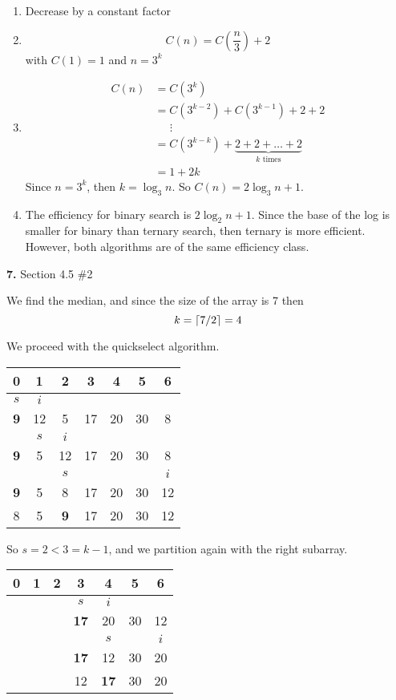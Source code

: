 \documentclass[letterpaper, 11pt]{article}
\newcommand{\hwnumbersec}[3]{\medskip \noindent\textbf{#1.} Section #2 \##3 \smallskip}
\DeclarePairedDelimiter{\ceil}{\lceil}{\rceil}
\begin{document}
\begin{enumerate}[label = (\alph*)]
  \item Decrease by a constant factor
  \item \[C(n) = C\left(\frac{n}{3}\right) + 2\]
    with \(C(1) = 1\) and \(n = 3^k\)
  \item 
    \begin{align*}
      C(n) &= C(3^k) \\
           &= C(3^{k-2}) + C(3^{k-1}) + 2 + 2\\
           &\;\;\;\;\;\vdots \\
           &= C(3^{k-k}) + \underbrace{2 + 2 + \dots + 2}_{k \text{ times}}\\
           &= 1 + 2k
    \end{align*}
    Since \(n = 3^k\), then \(k = \log_3 n\). So \(C(n) = 2\log_3 n + 1\).
  \item The efficiency for binary search is \(2\log_2 n + 1\). Since the base
    of the log is smaller for binary than ternary search, then ternary is more
    efficient. However, both algorithms are of the same efficiency class. 
\end{enumerate}

\hwnumbersec{7}{4.5}{2}

We find the median, and since the size of the array is 7 then 
\[k = \ceil*{7 / 2} = 4\]

We proceed with the quickselect algorithm. 

\begin{center}
  \begin{tabular}{ccccccc}
    0 & 1 & 2 & 3 & 4 & 5 & 6 \\
    \hline
    \(s\) & \(i\) \\
    \textbf{9} & 12 & 5 & 17 & 20 & 30 & 8 \\
               & \(s\) & \(i\) \\
    \textbf{9} & 5 & 12 & 17 & 20 & 30 & 8 \\
               & & \(s\)  & & & &  \(i\) \\
    \textbf{9} & 5 & 8 & 17 & 20 & 30 & 12 \\
     8 & 5 & \textbf{9} & 17 & 20 & 30 & 12 \\
  \end{tabular}
\end{center}

So \(s = 2 < 3 = k - 1\), and we partition again with the right subarray.
\begin{center}
  \begin{tabular}{ccccccc}
    0 & 1 & 2 & 3 & 4 & 5 & 6 \\
    \hline
      & & & \(s\) & \(i\) \\
      & & & \textbf{17} & 20 & 30 & 12 \\
      & & & & \(s\) & & \(i\) \\
      & & & \textbf{17} & 12 & 30 & 20 \\
      & & & 12 & \textbf{17} & 30 & 20 \\
  \end{tabular}
\end{center}
\end{document}
